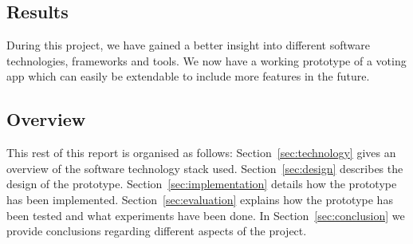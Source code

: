 \subsection{Results}
During this project, we have gained a better insight into different software technologies, frameworks and tools. 
We now have a working prototype of a voting app which can easily be extendable to include more features in the future. 
\subsection{Overview}
This rest of this report is organised as follows:
Section~\ref{sec:technology} gives an overview of the software technology stack used. 
Section~\ref{sec:design} describes the design of the prototype. 
Section~\ref{sec:implementation} details how the prototype has been implemented. 
Section~\ref{sec:evaluation} explains how the prototype has been tested and what experiments have been done.  
In Section~\ref{sec:conclusion} we provide conclusions regarding different aspects of the project.

